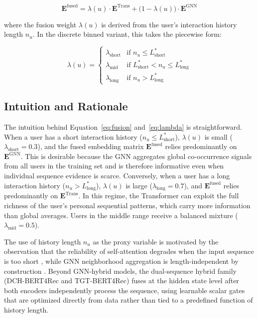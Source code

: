 \documentclass[12pt,a4paper]{report}
\begin{document}
\begin{equation}
    \mathbf{E}^{\text{fused}} = \lambda(u)\cdot \mathbf{E}^{\text{Trans}}
    + \bigl(1 - \lambda(u)\bigr)\cdot \mathbf{E}^{\text{GNN}}
    \label{eq:fusion}
\end{equation}

\noindent where the fusion weight \(\lambda(u)\) is derived from the user's
interaction history length \(n_u\). In the discrete binned variant, this takes
the piecewise form:

\begin{equation}
    \lambda(u) = \begin{cases}
        \lambda_{\text{short}} & \text{if } n_u \leq L^*_{\text{short}} \\[4pt]
        \lambda_{\text{mid}}   & \text{if } L^*_{\text{short}} < n_u \leq L^*_{\text{long}} \\[4pt]
        \lambda_{\text{long}}  & \text{if } n_u > L^*_{\text{long}}
    \end{cases}
    \label{eq:lambda}
\end{equation}

\subsection{Intuition and Rationale}

The intuition behind Equation~\ref{eq:fusion} and~\ref{eq:lambda} is
straightforward. When a user has a short interaction history (\(n_u \leq
L^*_{\text{short}}\)), \(\lambda(u)\) is small (\(\lambda_{\text{short}} =
0.3\)), and the fused embedding matrix \(\mathbf{E}^{\text{fused}}\) relies
predominantly on \(\mathbf{E}^{\text{GNN}}\). This is desirable because the GNN
aggregates global co-occurrence signals from all users in the training set and
is therefore informative even when individual sequence evidence is scarce.
Conversely, when a user has a long interaction history (\(n_u >
L^*_{\text{long}}\)), \(\lambda(u)\) is large (\(\lambda_{\text{long}} = 0.7\)),
and \(\mathbf{E}^{\text{fused}}\) relies predominantly on
\(\mathbf{E}^{\text{Trans}}\). In this regime, the Transformer can exploit the
full richness of the user's personal sequential patterns, which carry more
information than global averages. Users in the middle range receive a balanced
mixture (\(\lambda_{\text{mid}} = 0.5\)).

The use of history length \(n_u\) as the proxy variable is motivated by the
observation that the reliability of self-attention degrades when the input
sequence is too short \citep{kang2018sasrec, sun2019bert4rec}, while GNN
neighborhood aggregation is length-independent by construction
\citep{he2020lightgcn}. Beyond GNN-hybrid models, the dual-sequence hybrid
family (DCH-BERT4Rec and TGT-BERT4Rec) fuses at the hidden state level after
both encoders independently process the sequence, using learnable scalar gates
that are optimized directly from data rather than tied to a predefined function
of history length.
\end{document}
